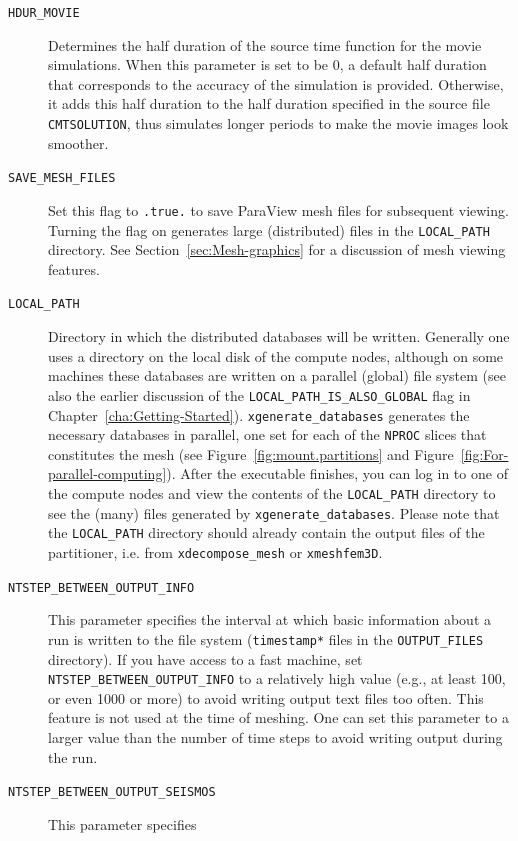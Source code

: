 \begin{description}
\item [{\texttt{HDUR\_MOVIE}}] Determines the half duration of the source
time function for the movie simulations. When this parameter is set
to be 0, a default half duration that corresponds to the accuracy
of the simulation is provided. Otherwise, it adds this half duration
to the half duration specified in the source file \texttt{CMTSOLUTION},
thus simulates longer periods to make the movie images look smoother.
\item [{\texttt{SAVE\_MESH\_FILES}}] Set this flag to \texttt{.true.} to
save ParaView  mesh files for
subsequent viewing. Turning the flag on generates large (distributed)
files in the \texttt{LOCAL\_PATH} directory. See Section~\ref{sec:Mesh-graphics}
for a discussion of mesh viewing features.
\item [{\texttt{LOCAL\_PATH}}] Directory in which the distributed databases
will be written. Generally one uses a directory on the local disk
of the compute nodes, although on some machines these databases are
written on a parallel (global) file system (see also the earlier discussion
of the \texttt{LOCAL\_PATH\_IS\_ALSO\_GLOBAL} flag in Chapter~\ref{cha:Getting-Started}).
\texttt{xgenerate\_databases} generates the necessary databases in
parallel, one set for each of the \texttt{NPROC} slices that constitutes
the mesh (see Figure~\ref{fig:mount.partitions} and Figure~\ref{fig:For-parallel-computing}).
After the executable finishes, you can log in to one of the compute
nodes and view the contents of the \texttt{LOCAL\_PATH} directory
to see the (many) files generated by \texttt{xgenerate\_databases}.
Please note that the \texttt{LOCAL\_PATH} directory should already
contain the output files of the partitioner, i.e. from \texttt{xdecompose\_mesh}
or \texttt{xmeshfem3D}.
\item [{\texttt{NTSTEP\_BETWEEN\_OUTPUT\_INFO}}] This parameter specifies
the interval at which basic information about a run is written to
the file system (\texttt{timestamp{*}} files in the \texttt{OUTPUT\_FILES}
directory). If you have access to a fast machine, set \texttt{NTSTEP\_BETWEEN\_OUTPUT\_INFO}
to a relatively high value (e.g., at least 100, or even 1000 or more)
to avoid writing output text files too often. This feature is not
used at the time of meshing. One can set this parameter to a larger
value than the number of time steps to avoid writing output during
the run.
\item [{\texttt{NTSTEP\_BETWEEN\_OUTPUT\_SEISMOS}}] This parameter specifies

\end{description}

